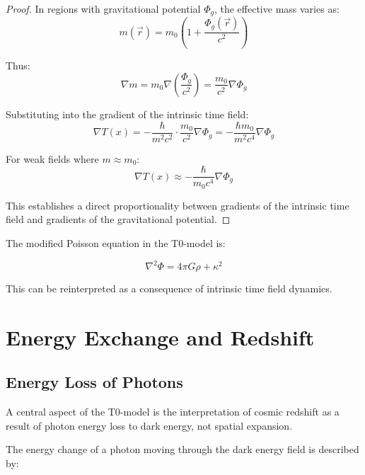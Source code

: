 \documentclass[a4paper,12pt]{article}
\theoremstyle{definition}
\theoremstyle{remark}
\newcommand{\Tfield}{T(x)} %
\begin{document}
	\begin{proof}
		In regions with gravitational potential \(\Phi_g\), the effective mass varies as:
		\begin{equation}
			m(\vec{r}) = m_0\left(1 + \frac{\Phi_g(\vec{r})}{c^2}\right)
		\end{equation}
		
		Thus:
		\begin{equation}
			\nabla m = m_0 \nabla\left(\frac{\Phi_g}{c^2}\right) = \frac{m_0}{c^2}\nabla\Phi_g
		\end{equation}
		
		Substituting into the gradient of the intrinsic time field:
		\begin{equation}
			\nabla \Tfield = -\frac{\hbar}{m^2c^2}\cdot\frac{m_0}{c^2}\nabla\Phi_g = -\frac{\hbar m_0}{m^2c^4}\nabla\Phi_g
		\end{equation}
		
		For weak fields where \(m \approx m_0\):
		\begin{equation}
			\nabla \Tfield \approx -\frac{\hbar}{m_0c^4}\nabla\Phi_g
		\end{equation}
		
		This establishes a direct proportionality between gradients of the intrinsic time field and gradients of the gravitational potential.
	\end{proof}
	
	The modified Poisson equation in the T0-model is:
	
	\begin{equation}
		\nabla^2 \Phi = 4\pi G \rho + \kappa^2
	\end{equation}
	
	This can be reinterpreted as a consequence of intrinsic time field dynamics.
	
	\section{Energy Exchange and Redshift}
	
	\subsection{Energy Loss of Photons}
	
	A central aspect of the T0-model is the interpretation of cosmic redshift as a result of photon energy loss to dark energy, not spatial expansion.
	
	The energy change of a photon moving through the dark energy field is described by:
	
\end{document}
